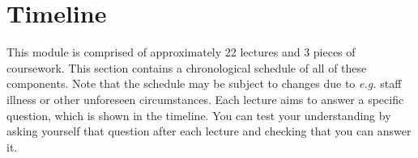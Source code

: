 
\section{Timeline}
\label{sec:timeline}

This module is comprised of approximately 22 lectures and 3 pieces of coursework. This section contains a chronological schedule of all of these components. Note that the schedule may be subject to changes due to \emph{e.g.} staff illness or other unforeseen circumstances. Each lecture aims to answer a specific question, which is shown in the timeline. You can test your understanding by asking yourself that question after each lecture and checking that you can answer it.

\newcommand{\foo}{\makebox[0pt]{\textbullet}\hskip-0.5pt\vrule width 1pt\hspace{\labelsep}}

\newcommand{\LectureEntry}[4]{#1 & \begin{tabular}{p{11cm}}
		\textbf{#2} \\[-0.15cm]
		\emph{#3} \\
		#4
\end{tabular}}
\newcommand{\LabEntry}[3]{#1 & \begin{tabular}{p{11cm}}
		\textbf{#2} \\
		#3
\end{tabular}}

